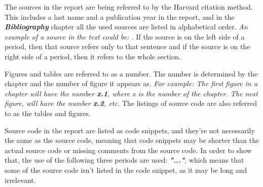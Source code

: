 The sources in the report are being referred to by the Harvard citation method. This includes a last name and a publication year in the report, and in the \textit{\textbf{Bibliography}} chapter all the used sources are listed in alphabetical order. \newline
\textit{An example of a source in the text could be: \textbf{\citep{Sebesta}}.}
\newline
If the source is on the left side of a period, then that source refers only to that sentence and if the source is on the right side of a period, then it refers to the whole section. 

Figures and tables are referred to as a number. The number is determined by the chapter and the number of figure it appears as. \newline
\textit{For example: The first figure in a chapter will have the number \textbf{x.1}, where x is the number of the chapter. The next figure, will have the number \textbf{x.2}, etc.}
\newline
The listings of source code are also referred to as the tables and figures. 

Source code in the report are listed as code snippets, and they're not necessarily the same as the source code, meaning that code snippets may be shorter than the actual source code or missing comments from the source code. In order to show that, the use of the following three periods are used: \textit\textbf{{"..."}}, which means that some of the source code isn't listed in the code snippet, as it may be long and irrelevant. 

